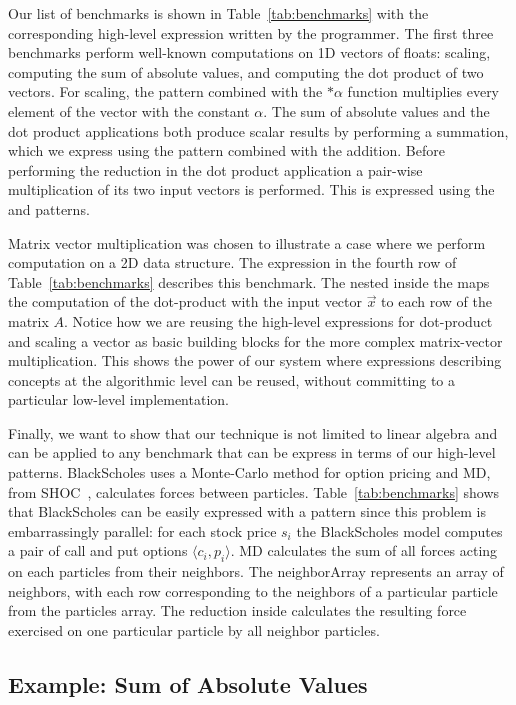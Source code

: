 Our list of benchmarks is shown in Table~\ref{tab:benchmarks} with the corresponding high-level expression written by the programmer.
The first three benchmarks perform well-known computations on 1D vectors of floats: scaling, computing the sum of absolute values, and computing the dot product of two vectors.
For scaling, the  pattern combined with the $\ast\alpha$ function multiplies every element of the vector with the constant $\alpha$.
The sum of absolute values and the dot product applications both produce scalar results by performing a summation, which we express using the  pattern combined with the addition.
Before performing the reduction in the dot product application a pair-wise multiplication of its two input vectors is performed.
This is expressed using the  and  patterns.

Matrix vector multiplication was chosen to illustrate a case where we perform computation on a 2D data structure.
The expression in the fourth row of Table~\ref{tab:benchmarks} describes this benchmark.
The  nested inside the  maps the computation of the dot-product with the input vector $\vec{x}$ to each row of the matrix $A$.
Notice how we are reusing the high-level expressions for dot-product and scaling a vector as basic building blocks for the more complex matrix-vector multiplication.
This shows the power of our system where expressions describing concepts at the algorithmic level can be reused, without committing to a particular low-level implementation.

Finally, we want to show that our technique is not limited to linear algebra and can be applied to any benchmark that can be express in terms of our high-level patterns.
BlackScholes uses a Monte-Carlo method for option pricing and MD, from SHOC~\cite{danalis10shoc}, calculates forces between particles.
Table~\ref{tab:benchmarks} shows that BlackScholes can be easily expressed with a  pattern since this problem is embarrassingly parallel: for each stock price $s_i$ the BlackScholes model computes a pair of call and put options $\langle c_i, p_i\rangle$.
MD calculates the sum of all forces acting on each particles from their neighbors.
The neighborArray represents an array of neighbors, with each row corresponding to the neighbors of a particular particle from the particles array.
The reduction inside  calculates the resulting force exercised on one particular particle by all neighbor particles.


\subsection{Example: Sum of Absolute Values}
\label{sec:example}

